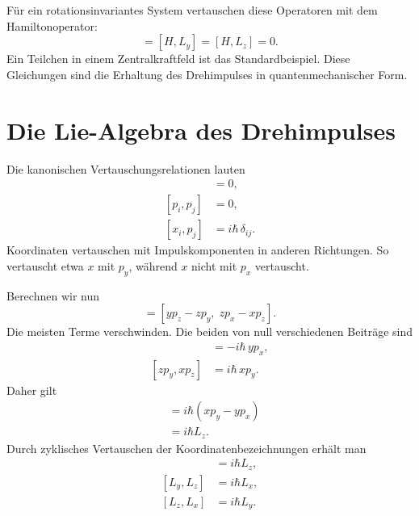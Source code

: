 Für ein rotationsinvariantes System vertauschen diese Operatoren mit dem Hamiltonoperator:
\begin{equation}
[H,L_x]=[H,L_y]=[H,L_z]=0.
\end{equation}
Ein Teilchen in einem Zentralkraftfeld ist das Standardbeispiel. Diese Gleichungen sind die Erhaltung des Drehimpulses in quantenmechanischer Form.

\section{Die Lie-Algebra des Drehimpulses}

Die kanonischen Vertauschungsrelationen lauten
\begin{align}
[x_i,x_j]&=0,\\
[p_i,p_j]&=0,\\
[x_i,p_j]&=i\hbar\,\delta_{ij}.
\end{align}
Koordinaten vertauschen mit Impulskomponenten in anderen Richtungen. So vertauscht etwa \(x\) mit \(p_y\), während \(x\) nicht mit \(p_x\) vertauscht.

Berechnen wir nun
\begin{equation}
[L_x,L_y]
=
[yp_z-zp_y,\;zp_x-xp_z].
\end{equation}
Die meisten Terme verschwinden. Die beiden von null verschiedenen Beiträge sind
\begin{align}
[yp_z,zp_x]&=-i\hbar\,yp_x,\\
[zp_y,xp_z]&=i\hbar\,xp_y.
\end{align}
Daher gilt
\begin{align}
[L_x,L_y]
&=i\hbar\left(xp_y-yp_x\right)\\
&=i\hbar L_z.
\end{align}
Durch zyklisches Vertauschen der Koordinatenbezeichnungen erhält man
\begin{align}
[L_x,L_y]&=i\hbar L_z,\\
[L_y,L_z]&=i\hbar L_x,\\
[L_z,L_x]&=i\hbar L_y.
\end{align}

\begin{classroomqa}
\end{classroomqa}

